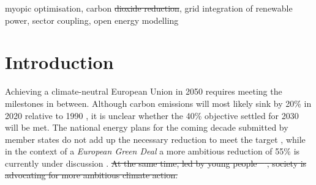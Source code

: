 \documentclass[5p]{elsarticle} %
\providecommand{\DIFaddtex}[1]{{\protect\color{blue}\uwave{#1}}} %
\providecommand{\DIFdeltex}[1]{{\protect\color{red}\sout{#1}}}                      %
\providecommand{\DIFaddbegin}{} %
\providecommand{\DIFaddend}{} %
\providecommand{\DIFdelbegin}{} %
\providecommand{\DIFdelend}{} %
\providecommand{\DIFadd}[1]{\texorpdfstring{\DIFaddtex{#1}}{#1}} %
\providecommand{\DIFdel}[1]{\texorpdfstring{\DIFdeltex{#1}}{}} %
\newcommand{\DIFscaledelfig}{0.5}
\newlength{\DIFdelgraphicswidth} %
\newlength{\DIFdelgraphicsheight} %
\newcommand{\DIFaddincludegraphics}[2][]{{\color{blue}\fbox{\DIFOincludegraphics[#1]{#2}}}} %
\newcommand{\DIFdelincludegraphics}[2][]{%
\sbox{\DIFdelgraphicsbox}{\DIFOincludegraphics[#1]{#2}}%
\settoboxwidth{\DIFdelgraphicswidth}{\DIFdelgraphicsbox} %
\settoboxtotalheight{\DIFdelgraphicsheight}{\DIFdelgraphicsbox} %
\scalebox{\DIFscaledelfig}{%
\parbox[b]{\DIFdelgraphicswidth}{\usebox{\DIFdelgraphicsbox}\\[-\baselineskip] \rule{\DIFdelgraphicswidth}{0em}}\llap{\resizebox{\DIFdelgraphicswidth}{\DIFdelgraphicsheight}{%
\setlength{\unitlength}{\DIFdelgraphicswidth}%
\begin{picture}(1,1)%
\thicklines\linethickness{2pt} %
{\color[rgb]{1,0,0}\put(0,0){\framebox(1,1){}}}%
{\color[rgb]{1,0,0}\put(0,0){\line( 1,1){1}}}%
{\color[rgb]{1,0,0}\put(0,1){\line(1,-1){1}}}%
\end{picture}%
}\hspace*{3pt}}} %
} %
\DeclareRobustCommand{\DIFaddbegin}{\DIFOaddbegin \let\includegraphics\DIFaddincludegraphics} %
\DeclareRobustCommand{\DIFaddend}{\DIFOaddend \let\includegraphics\DIFOincludegraphics} %
\DeclareRobustCommand{\DIFdelbegin}{\DIFOdelbegin \let\includegraphics\DIFdelincludegraphics} %
\DeclareRobustCommand{\DIFdelend}{\DIFOaddend \let\includegraphics\DIFOincludegraphics} %
\begin{document}
\begin{frontmatter}
\begin{abstract}
\DIFaddbegin 

\DIFaddend \end{abstract}

\begin{keyword}
myopic optimisation, carbon \DIFdelbegin \DIFdel{dioxide reduction}\DIFdelend \DIFaddbegin \DIFadd{budget}\DIFaddend , grid integration of renewable power, sector coupling, open energy modelling
\end{keyword}

\end{frontmatter}

\linenumbers

\section{Introduction}

Achieving a climate-neutral European Union in 2050 \cite{in-depth_2018} requires meeting the milestones in between. Although carbon emissions will most likely sink by 20\% in 2020 relative to 1990 \cite{EEA_totalGHG}, it is unclear whether the 40\% objective settled for 2030 will be met. The national energy plans for the coming decade submitted by member states do not add up the necessary reduction to meet the target \cite{EU-appraisal_2019}, while in the context of a \textit{European Green Deal} a more ambitious reduction of 55\% is currently under discussion \cite{GreenDeal}. \DIFdelbegin \DIFdel{At the same time, led by young people \mbox{%
\cite{Warren_2019}}\hspace{0pt}%
, society is advocating for more ambitious climate action. }\DIFdelend \\ %
\end{document}
